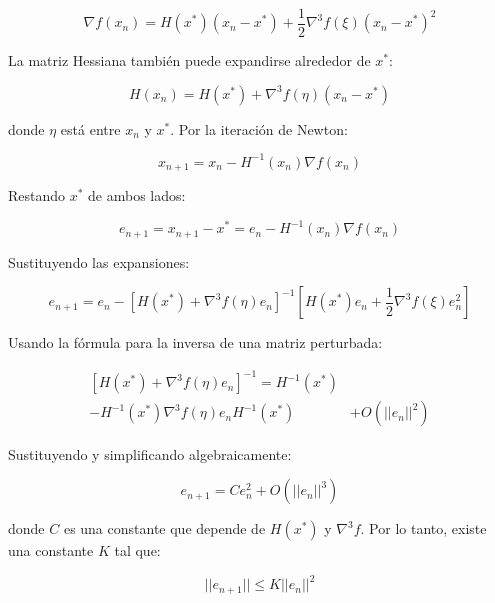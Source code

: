 \documentclass{tp02}
\begin{document}
    \begin{equation}
    \nabla f(x_n) = H(x^*)(x_n - x^*) + \frac{1}{2}\nabla^3f(\xi)(x_n - x^*)^2
    \end{equation}
    
    La matriz Hessiana también puede expandirse alrededor de $x^*$:
    
    \begin{equation}
    H(x_n) = H(x^*) + \nabla^3f(\eta)(x_n - x^*)
    \end{equation}
    
    donde $\eta$ está entre $x_n$ y $x^*$. Por la iteración de Newton:
    
    \begin{equation}
    x_{n+1} = x_n - H^{-1}(x_n)\nabla f(x_n)
    \end{equation}
    
    Restando $x^*$ de ambos lados:
    
    \begin{equation}
    e_{n+1} = x_{n+1} - x^* = e_n - H^{-1}(x_n)\nabla f(x_n)
    \end{equation}
    
    Sustituyendo las expansiones:
    
    \begin{equation}
    e_{n+1} = e_n - [H(x^*) + \nabla^3f(\eta)e_n]^{-1}[H(x^*)e_n + 
    \frac{1}{2}\nabla^3f(\xi)e_n^2]
    \end{equation}
    
    Usando la fórmula para la inversa de una matriz perturbada:
    
    \begin{equation}
    \begin{split}
    [H(x^*) + \nabla^3f(\eta)e_n]^{-1} = H^{-1}(x^*) \\
        - H^{-1}(x^*)\nabla^3f(\eta)e_nH^{-1}(x^*) & + O(||e_n||^2)
    \end{split}
    \end{equation}
    
    Sustituyendo y simplificando algebraicamente:
    
    \begin{equation}
    e_{n+1} = Ce_n^2 + O(||e_n||^3)
    \end{equation}
    
    donde $C$ es una constante que depende de $H(x^*)$ y $\nabla^3f$. Por lo 
    tanto, existe una constante $K$ tal que:
    
    \begin{equation}
    ||e_{n+1}|| \leq K||e_n||^2
    \end{equation}
\end{document}

